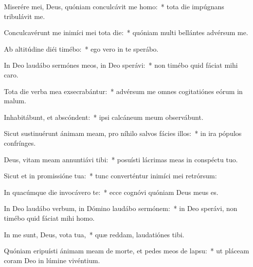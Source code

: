 \item Miserére mei, Deus, quóniam conculcávit me homo:~* tota die impúgnans tribulávit me.

\item Conculcavérunt me inimíci mei tota die:~* quóniam multi bellántes advérsum me.

\item Ab altitúdine diéi timébo:~* ego vero in te sperábo.

\item In Deo laudábo sermónes meos, in Deo sperávi:~* non timébo quid fáciat mihi caro.

\item Tota die verba mea exsecrabántur:~* advérsum me omnes cogitatiónes eórum in malum.

\item Inhabitábunt, et abscóndent:~* ipsi calcáneum meum observábunt.

\item Sicut sustinuérunt ánimam meam, pro níhilo salvos fácies illos:~* in ira pópulos confrínges.

\item Deus, vitam meam annuntiávi tibi:~* posuísti lácrimas meas in conspéctu tuo.

\item Sicut et in promissióne tua:~* tunc converténtur inimíci mei retrórsum:

\item In quacúmque die invocávero te:~* ecce cognóvi quóniam Deus meus es.

\item In Deo laudábo verbum, in Dómino laudábo sermónem:~* in Deo sperávi, non timébo quid fáciat mihi homo.

\item In me sunt, Deus, vota tua,~* quæ reddam, laudatiónes tibi.

\item Quóniam eripuísti ánimam meam de morte, et pedes meos de lapsu:~* ut pláceam coram Deo in lúmine vivéntium.
